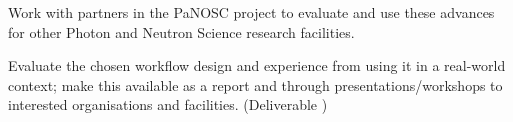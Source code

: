 \begin{task}[
  title=Reproducible X-ray crystallography workflows at European XFEL,
  id=reproducibility-xfel,
  lead=XFEL,
  PM=36,
  wphases={6-48},
  partners={}
  ]
\begin{compactitem}
  \item Work with partners in the PaNOSC project to evaluate and use
    these advances for other Photon and Neutron Science research
    facilities.

  \item Evaluate the chosen workflow design and experience from using
    it in a real-world context; make this available as a report and
    through presentations/workshops to interested organisations and
    facilities. (Deliverable )
  \end{compactitem}

  \end{task}
